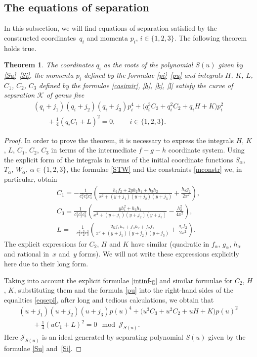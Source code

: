 \documentclass[pdftex]{sigma}
\def\a{\alpha}
\numberwithin{equation}{section}
\newtheorem{Theorem}{Theorem}[section]
\begin{document}
\subsection{The equations of separation}
In this subsection, we will find equations of separation satisfied by the constructed coordinates~$q_i$ and momenta $p_i$, $i\in \{1,2,3\}$.
The following theorem holds true.
\begin{Theorem}\label{sepeq}
The coordinates $q_i$ as the roots of the polynomial $S(u)$ given by \eqref{Su}--\eqref{Si}, the momenta $p_i$ defined by the formulae
\eqref{pi}--\eqref{pu} and integrals $H$, $K$, $L$, $C_1$, $C_2$, $C_3$ defined by the formulae \eqref{casimir}, \eqref{h}, \eqref{k}, \eqref{l}
satisfy the curve of separation $\mathcal{K}$ of genus five
\begin{gather}
(q_i+j_1)(q_i+j_2)(q_i+j_3) p_i^4+\big(q_i^3 C_3+q_i^2 C_2+ q_i H+K \big) p_i^2\nonumber \\
\qquad{}+ \frac{1}{4}(q_i C_1+L)^2=0,\qquad i\in \{1,2,3\}.\label{eqsepi}
\end{gather}
\end{Theorem}
\begin{proof}
In order to prove the theorem, it is necessary to express the integrals $H$, $K$, $L$, $C_1$, $C_2$, $C_3$ in terms of the intermediate $f-g-h$ coordinate system. %
 Using the explicit form of the integrals in terms of the initial coordinate functions $S_{\a}$, $T_{\a}$, $W_{\a}$, $\a\in \{1,2,3\}$, the formulae \eqref{STW} and the constraints \eqref{mconstr} we, in particular, obtain
\begin{subequations}\label{intinf-g}
\begin{gather}
C_1= -\frac{1}{c_1^2 c_2^2 c_3^2 }\left( \frac{h_1 f_2+ 2 y h_2 h_1+h_3 h_2}{x^2+(y+j_1)(y+j_2)(y+j_3)}+\frac{h_2 g_2}{2 x^2}\right),\label{intinf-g-1}
\\
C_3=\frac{1}{c_1^2 c_2^2 c_3^2 }\left( \frac{ y h_1^2+h_3 h_1}{x^2+(y+j_1)(y+j_2)(y+j_3)} - \frac{h_2^2}{4 x^2} \right),\label{intinf-g-3}
\\
L= -\frac{1}{c_1^2 c_2^2 c_3^2 }\left( \frac{ 2yf_1 h_2+f_3h_2+f_2 f_1}{x^2+(y+j_1)(y+j_2)(y+j_3)}+\frac{g_2 f_2}{2 x^2}\right).
\end{gather}
\end{subequations}
 The explicit expressions for $C_2$, $H$ and $K$ have similar (quadratic in $f_{\a}$, $g_{\a}$, $h_{\a}$ and rational in~$x$ and~$y$ forms). We will not write these expressions explicitly here due to their long form.


Taking into account the explicit formulae
\eqref{intinf-g} and similar formulae for $C_2$, $H$, $K$, substituting them and the formula \eqref{pu} into the right-hand sides of the equalities \eqref{eqsepi}, after long and tedious calculations, we obtain that
\begin{gather*}%
(u+j_1)(u+j_2)(u+j_3) p(u)^4+\big(u^3 C_3+u^2 C_2+ u H+K \big) p(u)^2\\
\qquad {}+ \frac{1}{4}(u C_1+L)^2=0 \mod \mathcal{J}_{S(u)}.
\end{gather*}
Here $\mathcal{J}_{S(u)}$ is an ideal generated by separating polynomial $S(u)$ given by the formulae \eqref{Su} and~\eqref{Si}.
\end{proof}
\end{document}
